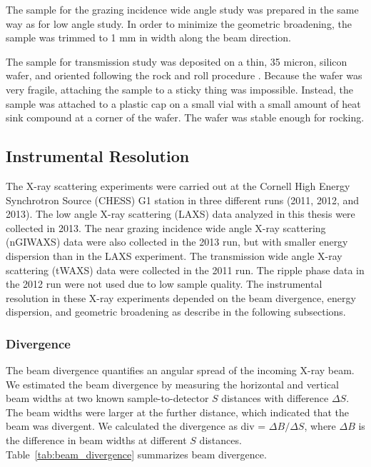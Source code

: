 The sample for the grazing incidence wide angle study was prepared in the same way 
as for low angle study. In order to minimize the geometric broadening, the 
sample was trimmed to 1 mm in width along the beam direction.

The sample for transmission study was deposited on a thin, 35 micron, silicon
wafer, and oriented following the rock and roll procedure \cite{Tristram-Nagle07_MMB}.  
Because the wafer was very fragile, attaching the sample to a sticky 
thing was impossible. Instead, the sample was attached to a plastic cap on 
a small vial with a small amount of heat sink compound at a corner of the 
wafer. The wafer was stable enough for rocking. 

\subsection{Instrumental Resolution}\label{sec:instrumental_resolution}
The X-ray scattering experiments were carried out at the Cornell 
High Energy Synchrotron Source (CHESS) G1 station in three different runs
(2011, 2012, and 2013). 
The low angle X-ray scattering (LAXS) data analyzed 
in this thesis were collected in 2013.
The near grazing incidence wide angle X-ray scattering (nGIWAXS) data were also collected
in the 2013 run, but with smaller energy dispersion than in the LAXS experiment.
The transmission wide angle X-ray scattering (tWAXS) data were collected
in the 2011 run. The ripple phase data in the 2012 run were not used
due to low sample quality.
The instrumental resolution in these X-ray experiments depended on the beam
divergence, energy dispersion, and geometric broadening 
as describe in the following subsections.

\subsubsection{Divergence}\label{sec:divergence}
The beam divergence quantifies an angular spread of the incoming X-ray
beam. We estimated the beam divergence by measuring the horizontal and 
vertical beam widths at two known sample-to-detector $S$ distances
with difference $\Delta S$. 
The beam widths were larger at the further distance, which indicated 
that the beam was divergent. 
We calculated the divergence as div = $\Delta B/\Delta S$, where
$\Delta B$ is the difference in beam widths at different $S$ distances.
Table~\ref{tab:beam_divergence} summarizes beam divergence.

